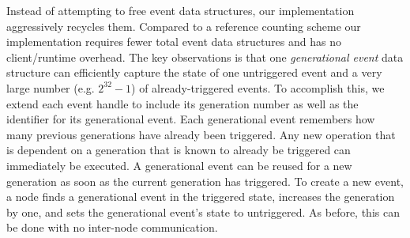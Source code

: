 Instead of attempting to free event data structures, our implementation aggressively recycles them.
Compared to a reference counting scheme our implementation requires fewer total event data structures
and has no client/runtime overhead.  The key observations is that one {\em generational event}
data structure can efficiently capture the state of one untriggered event and a very large 
number (e.g. $2^{32}-1$) of already-triggered events.  To accomplish this, we extend each event
handle to include its generation number as well as the identifier for its generational event.  Each
generational event remembers how many previous generations have already been triggered.  Any
new operation that is dependent on a generation that is known to already be triggered can immediately
be executed.  A generational event can be reused for a new generation as soon as the current generation has triggered. To
create a new event, a node finds a generational event in the triggered state,
increases the generation by one, and sets the generational event's state to untriggered.  As before, 
this can be done with no inter-node communication.

